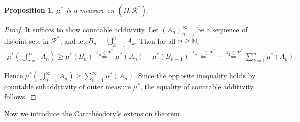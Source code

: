 \documentclass{article}
\numberwithin{equation}{section}
\theoremstyle{plain}
\newtheorem{proposition}[theorem]{Proposition}
\theoremstyle{definition}
\begin{document}
\begin{proposition}\label{prop:1.20} $\mu^*$ is a measure on $(\Omega,\mathscr{R}^*)$.
\end{proposition}
\begin{proof}
It suffices to show countable additivity. Let $(A_n)_{n=1}^\infty$ be a sequence of disjoint sets in $\mathscr{R}^*$, and let $B_n=\bigcup_{k=1}^n A_k$. Then for all $n\geq\mathbb{N}$,
\begin{align*}
	\mu^*\left(\bigcup_{n=1}^\infty A_n\right) \geq \mu^*(B_n) \overset{A_n\in\mathscr{R}^*}{=} \mu^*(A_n) + \mu^*(B_{n-1}) \overset{A_{n-1}\in\mathscr{R}^*}{=} \cdots \overset{A_2\in\mathscr{R}^*}{=} \sum_{k=1}^n \mu^*(A_k).
\end{align*}

Hence $\mu^*\left(\bigcup_{n=1}^\infty A_n\right) \geq\sum_{n=1}^\infty \mu^*(A_n)$. Since the opposite inequality holds by countable subadditivity of outer measure $\mu^*$, the equality of countable additivity follows.
\end{proof}

Now we introduce the Carathéodory's extension theorem.
\end{document}
